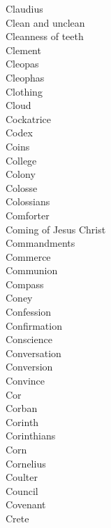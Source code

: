 Claudius  \\
Clean and unclean  \\
Cleanness of teeth  \\
Clement  \\
Cleopas  \\
Cleophas  \\
Clothing  \\
Cloud  \\
Cockatrice  \\
Codex  \\
Coins  \\
College  \\
Colony  \\
Colosse  \\
Colossians  \\
Comforter  \\
Coming of Jesus Christ  \\
Commandments  \\
Commerce  \\
Communion  \\
Compass  \\
Coney  \\
Confession  \\
Confirmation  \\
Conscience  \\
Conversation  \\
Conversion  \\
Convince  \\
Cor  \\
Corban  \\
Corinth  \\
Corinthians  \\
Corn  \\
Cornelius  \\
Coulter  \\
Council  \\
Covenant  \\
Crete  \\
